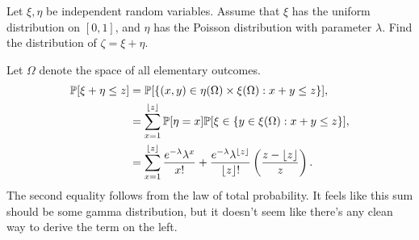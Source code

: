 \begin{problem}{11}
    Let $\xi,\eta$ be independent random variables. Assume that $\xi$ has the uniform distribution on $[0,1]$, and $\eta$ has the Poisson distribution with parameter $\lambda$. Find the distribution of $\zeta = \xi + \eta$. 
\end{problem}
\begin{solution}
    Let $\Omega$ denote the space of all elementary outcomes. 
    \begin{align*}
        \mathbb{P}[\xi + \eta \leq z] &= \mathbb{P}[\{(x,y) \in \eta(\Omega) \times \xi(\Omega): x + y \leq z\}], \\
        &= \sum_{x=1}^{\lfloor z\rfloor} \mathbb{P}[\eta = x]\mathbb{P}[\xi \in \{y \in \xi(\Omega): x + y \leq z\}], \\
        &= \sum_{x=1}^{\lfloor z\rfloor} \frac{e^{-\lambda} \lambda^x}{x!} + \frac{e^{-\lambda}\lambda^{\lfloor z\rfloor}}{\lfloor z\rfloor!}\left(\frac{z - \lfloor z\rfloor}{z}\right).
    \end{align*}
    The second equality follows from the law of total probability. It feels like this sum should be some gamma distribution, but it doesn't seem like there's any clean way to derive the term on the left. 
\end{solution}

